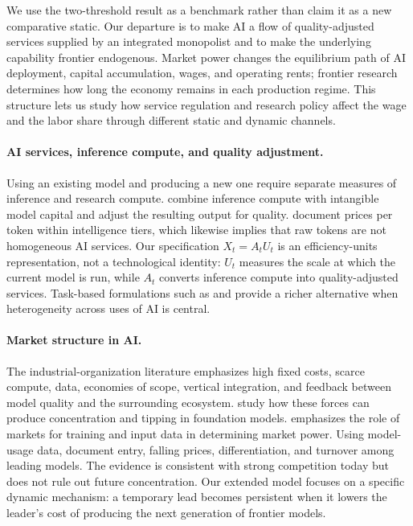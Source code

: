 We use the two-threshold result as a benchmark rather than claim it as a new
comparative static. Our departure is to make AI a flow of quality-adjusted services
supplied by an integrated monopolist and to make the underlying capability frontier
endogenous. Market power changes the equilibrium path of AI deployment, capital
accumulation, wages, and operating rents; frontier research determines how long the
economy remains in each production regime. This structure lets us study how service
regulation and research policy affect the wage and the labor share through different
static and dynamic channels.

\paragraph{AI services, inference compute, and quality adjustment.}
Using an existing model and producing a new one require separate measures of
inference and research compute. \citet{korinekmckelvey2026} combine inference compute
with intangible model capital and adjust the resulting output for quality.
\citet{demireretal2025} document prices per token within intelligence tiers, which
likewise implies that raw tokens are not homogeneous AI services. Our specification
$X_t=A_tU_t$ is an efficiency-units representation, not a technological identity:
$U_t$ measures the scale at which the current model is run, while $A_t$ converts
inference compute into quality-adjusted services. Task-based formulations such as
\citet{aghionjonesjones2019} and \citet{acemoglu2025} provide a richer alternative
when heterogeneity across uses of AI is central.

\paragraph{Market structure in AI.}
The industrial-organization literature emphasizes high fixed costs, scarce compute,
data, economies of scope, vertical integration, and feedback between model quality and
the surrounding ecosystem. \citet{korinekvipra2025} study how these forces can produce
concentration and tipping in foundation models. \citet{gans2024} emphasizes the role of
markets for training and input data in determining market power. Using model-usage
data, \citet{demireretal2025} document entry, falling prices, differentiation, and
turnover among leading models. The evidence is consistent with strong competition
today but does not rule out future concentration. Our extended model focuses on a
specific dynamic mechanism: a temporary lead becomes persistent when it lowers the
leader's cost of producing the next generation of frontier models.

